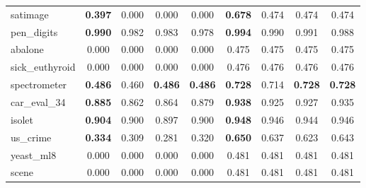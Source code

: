 \begin{figure}[ht]
\begin{tabular}{p{22mm}|*4{p{14mm}}|*4{p{14mm}}}
        satimage&\multicolumn{1}{c}{\textbf{0.397}}&\multicolumn{1}{c}{0.000}&\multicolumn{1}{c}{0.000}&\multicolumn{1}{c|}{0.000}&\multicolumn{1}{c}{\textbf{0.678}}&\multicolumn{1}{c}{0.474}&\multicolumn{1}{c}{0.474}&\multicolumn{1}{c}{0.474}\\
        pen\_digits&\multicolumn{1}{c}{\textbf{0.990}}&\multicolumn{1}{c}{0.982}&\multicolumn{1}{c}{0.983}&\multicolumn{1}{c|}{0.978}&\multicolumn{1}{c}{\textbf{0.994}}&\multicolumn{1}{c}{0.990}&\multicolumn{1}{c}{0.991}&\multicolumn{1}{c}{0.988}\\
        abalone&\multicolumn{1}{c}{0.000}&\multicolumn{1}{c}{0.000}&\multicolumn{1}{c}{0.000}&\multicolumn{1}{c|}{0.000}&\multicolumn{1}{c}{0.475}&\multicolumn{1}{c}{0.475}&\multicolumn{1}{c}{0.475}&\multicolumn{1}{c}{0.475}\\
        sick\_euthyroid&\multicolumn{1}{c}{0.000}&\multicolumn{1}{c}{0.000}&\multicolumn{1}{c}{0.000}&\multicolumn{1}{c|}{0.000}&\multicolumn{1}{c}{0.476}&\multicolumn{1}{c}{0.476}&\multicolumn{1}{c}{0.476}&\multicolumn{1}{c}{0.476}\\
        spectrometer&\multicolumn{1}{c}{\textbf{0.486}}&\multicolumn{1}{c}{0.460}&\multicolumn{1}{c}{\textbf{0.486}}&\multicolumn{1}{c|}{\textbf{0.486}}&\multicolumn{1}{c}{\textbf{0.728}}&\multicolumn{1}{c}{0.714}&\multicolumn{1}{c}{\textbf{0.728}}&\multicolumn{1}{c}{\textbf{0.728}}\\
        car\_eval\_34&\multicolumn{1}{c}{\textbf{0.885}}&\multicolumn{1}{c}{0.862}&\multicolumn{1}{c}{0.864}&\multicolumn{1}{c|}{0.879}&\multicolumn{1}{c}{\textbf{0.938}}&\multicolumn{1}{c}{0.925}&\multicolumn{1}{c}{0.927}&\multicolumn{1}{c}{0.935}\\
        isolet&\multicolumn{1}{c}{\textbf{0.904}}&\multicolumn{1}{c}{0.900}&\multicolumn{1}{c}{0.897}&\multicolumn{1}{c|}{0.900}&\multicolumn{1}{c}{\textbf{0.948}}&\multicolumn{1}{c}{0.946}&\multicolumn{1}{c}{0.944}&\multicolumn{1}{c}{0.946}\\
        us\_crime&\multicolumn{1}{c}{\textbf{0.334}}&\multicolumn{1}{c}{0.309}&\multicolumn{1}{c}{0.281}&\multicolumn{1}{c|}{0.320}&\multicolumn{1}{c}{\textbf{0.650}}&\multicolumn{1}{c}{0.637}&\multicolumn{1}{c}{0.623}&\multicolumn{1}{c}{0.643}\\
        yeast\_ml8&\multicolumn{1}{c}{0.000}&\multicolumn{1}{c}{0.000}&\multicolumn{1}{c}{0.000}&\multicolumn{1}{c|}{0.000}&\multicolumn{1}{c}{0.481}&\multicolumn{1}{c}{0.481}&\multicolumn{1}{c}{0.481}&\multicolumn{1}{c}{0.481}\\
        scene&\multicolumn{1}{c}{0.000}&\multicolumn{1}{c}{0.000}&\multicolumn{1}{c}{0.000}&\multicolumn{1}{c|}{0.000}&\multicolumn{1}{c}{0.481}&\multicolumn{1}{c}{0.481}&\multicolumn{1}{c}{0.481}&\multicolumn{1}{c}{0.481}\\

\end{tabular}
\end{figure}
